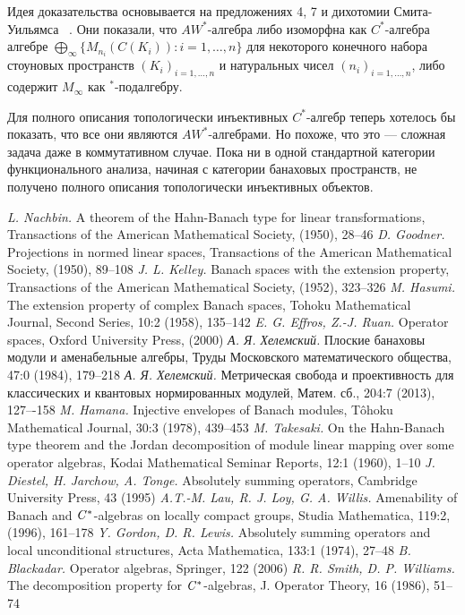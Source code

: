 \documentclass[12pt]{article}
\begin{document}
\medskip
Идея доказательства основывается на предложениях 4, 7 и дихотомии Смита-Уильямса
~\cite{SmithDecompPropCStarAlg}. Они показали, что $AW^*$-алгебра либо изоморфна
как $C^*$-алгебра алгебре $\bigoplus_\infty \{M_{n_i}(C(K_i)):i=1,\ldots,n \}$
для некоторого конечного набора стоуновых пространств ${(K_i)}_{i=1,\ldots,n}$ и
натуральных чисел ${(n_i)}_{i=1,\ldots,n}$, либо содержит $M_\infty$ как
${}^*$-подалгебру. 

Для полного описания топологически инъективных $C^*$-алгебр теперь хотелось бы
показать, что все они являются $AW^*$-алгебрами. Но похоже, что это --- сложная
задача даже в коммутативном случае. Пока ни в одной стандартной категории
функционального анализа, начиная с категории банаховых пространств, не получено
полного описания топологически инъективных объектов.

\begin{thebibliography}{999}
\textit{L. Nachbin.} A theorem of the Hahn-Banach type for linear
transformations, Transactions of the American Mathematical Society, (1950),
28--46
\textit{D. Goodner.} Projections in normed linear spaces, Transactions of the
American Mathematical Society, (1950), 89--108
\textit{J. L. Kelley.} Banach spaces with the extension property, Transactions
of the American Mathematical Society, (1952), 323--326
\textit{M. Hasumi.} The extension property of complex Banach spaces, Tohoku
Mathematical Journal, Second Series, 10:2 (1958), 135--142
\textit{E. G. Effros, Z.-J. Ruan.} Operator spaces, Oxford University Press,
(2000)
\textit{А. Я. Хелемский.} Плоские банаховы модули и аменабельные алгебры, Труды
Московского математического общества, 47:0 (1984), 179--218
\textit{А. Я. Хелемский.} Метрическая свобода и проективность для классических и
квантовых нормированных модулей, Матем. сб., 204:7 (2013), 127–-158 
\textit{M. Hamana.} Injective envelopes of Banach modules, T{\^o}hoku
Mathematical Journal, 30:3 (1978), 439--453
\textit{M. Takesaki.} On the Hahn-Banach type theorem and the Jordan
decomposition of module linear mapping over some operator algebras, Kodai
Mathematical Seminar Reports, 12:1 (1960), 1--10
\textit{J. Diestel, H. Jarchow, A. Tonge.} Absolutely summing operators,
Cambridge University Press, 43 (1995)
\textit{A.T.-M. Lau, R. J. Loy, G. A. Willis.} Amenability of Banach and
$\it{C^*}$-algebras on locally compact groups, Studia Mathematica, 119:2,
(1996), 161--178
\textit{Y. Gordon, D. R. Lewis.} Absolutely summing operators and local
unconditional structures, Acta Mathematica, 133:1 (1974), 27--48
\textit{B. Blackadar.} Operator algebras, Springer, 122 (2006)
\textit{R. R. Smith, D. P. Williams.} The decomposition property for
$\it{C^*}$-algebras, J. Operator Theory, 16 (1986), 51--74
\end{thebibliography}
\end{document}
